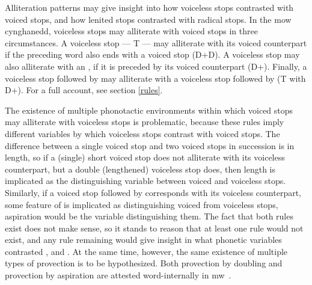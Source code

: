 Alliteration patterns may give insight into how voiceless stops contrasted with voiced stops, and how lenited stops contrasted with radical stops. In the \gls{mow} cynghanedd, voiceless stops may  alliterate with voiced stops in three circumstances. A voiceless stop --- \gls{T} --- may alliterate with its voiced counterpart if the preceding word also ends with a voiced stop (\gls{D}+\gls{D}). A voiceless stop may also alliterate with an , if it is preceded by its voiced counterpart (\gls{D}+). Finally, a voiceless stop followed by  may alliterate with a voiceless stop followed by  (\gls{T} with \gls{D}+). For a full account, see section \ref{rules}.

The existence of multiple phonotactic environments within which voiced stops may alliterate with voiceless stops is problematic, because these rules imply different variables by which voiceless stops contrast with voiced stops. The difference between a single voiced stop and two voiced stops in succession is in length, so if a (single) short voiced stop does not alliterate with its voiceless counterpart, but a double (lengthened) voiceless stop does, then  length is implicated as the distinguishing variable between voiced and voiceless stops. Similarly, if a voiced stop followed by  corresponds with its voiceless counterpart, some feature of  is implicated as distinguishing voiced from voiceless stops, \ie aspiration would be the variable distinguishing them. The fact that both rules exist does not make sense, so it stands to reason that at least one rule would not exist, and any rule remaining would give insight in what phonetic variables contrasted , and . At the same time, however, the same existence of multiple types of provection is to be hypothesized. Both provection by doubling and provection by aspiration are attested word-internally in \gls{mw}~\parencite[\S 17]{evans_grammar_1964}.


